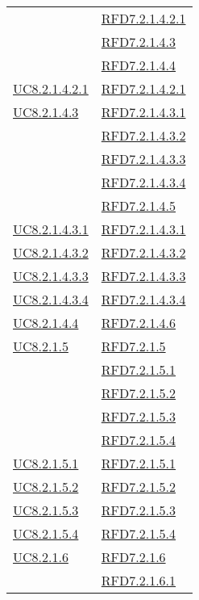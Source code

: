 \begin{longtable}{|>{\centering}m{5cm}|m{5cm}<{\centering}|}
& \hyperlink{RFD7.2.1.4.2.1}{RFD7.2.1.4.2.1}\\
& \hyperlink{RFD7.2.1.4.3}{RFD7.2.1.4.3}\\
& \hyperlink{RFD7.2.1.4.4}{RFD7.2.1.4.4}\\ \hline
\hyperref[UC8.2.1.4.2.1]{UC8.2.1.4.2.1} & \hyperlink{RFD7.2.1.4.2.1}{RFD7.2.1.4.2.1}\\ \hline
\hyperref[UC8.2.1.4.3]{UC8.2.1.4.3} & \hyperlink{RFD7.2.1.4.3.1}{RFD7.2.1.4.3.1}\\
& \hyperlink{RFD7.2.1.4.3.2}{RFD7.2.1.4.3.2}\\
& \hyperlink{RFD7.2.1.4.3.3}{RFD7.2.1.4.3.3}\\
& \hyperlink{RFD7.2.1.4.3.4}{RFD7.2.1.4.3.4}\\
& \hyperlink{RFD7.2.1.4.5}{RFD7.2.1.4.5}\\ \hline
\hyperref[UC8.2.1.4.3.1]{UC8.2.1.4.3.1} & \hyperlink{RFD7.2.1.4.3.1}{RFD7.2.1.4.3.1}\\ \hline
\hyperref[UC8.2.1.4.3.2]{UC8.2.1.4.3.2} & \hyperlink{RFD7.2.1.4.3.2}{RFD7.2.1.4.3.2}\\ \hline
\hyperref[UC8.2.1.4.3.3]{UC8.2.1.4.3.3} & \hyperlink{RFD7.2.1.4.3.3}{RFD7.2.1.4.3.3}\\ \hline
\hyperref[UC8.2.1.4.3.4]{UC8.2.1.4.3.4} & \hyperlink{RFD7.2.1.4.3.4}{RFD7.2.1.4.3.4}\\ \hline
\hyperref[UC8.2.1.4.4]{UC8.2.1.4.4} & \hyperlink{RFD7.2.1.4.6}{RFD7.2.1.4.6}\\ \hline
\hyperref[UC8.2.1.5]{UC8.2.1.5} & \hyperlink{RFD7.2.1.5}{RFD7.2.1.5}\\
& \hyperlink{RFD7.2.1.5.1}{RFD7.2.1.5.1}\\
& \hyperlink{RFD7.2.1.5.2}{RFD7.2.1.5.2}\\
& \hyperlink{RFD7.2.1.5.3}{RFD7.2.1.5.3}\\
& \hyperlink{RFD7.2.1.5.4}{RFD7.2.1.5.4}\\ \hline
\hyperref[UC8.2.1.5.1]{UC8.2.1.5.1} & \hyperlink{RFD7.2.1.5.1}{RFD7.2.1.5.1}\\ \hline
\hyperref[UC8.2.1.5.2]{UC8.2.1.5.2} & \hyperlink{RFD7.2.1.5.2}{RFD7.2.1.5.2}\\ \hline
\hyperref[UC8.2.1.5.3]{UC8.2.1.5.3} & \hyperlink{RFD7.2.1.5.3}{RFD7.2.1.5.3}\\ \hline
\hyperref[UC8.2.1.5.4]{UC8.2.1.5.4} & \hyperlink{RFD7.2.1.5.4}{RFD7.2.1.5.4}\\ \hline
\hyperref[UC8.2.1.6]{UC8.2.1.6} & \hyperlink{RFD7.2.1.6}{RFD7.2.1.6}\\
& \hyperlink{RFD7.2.1.6.1}{RFD7.2.1.6.1}\\

\end{longtable}
